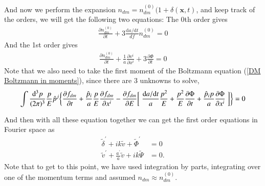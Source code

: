\documentclass[a4paper, 12pt]{article}
\begin{document}
{{    And now we perform the expansion \( n_{dm } = n^{(0)}_{dm }(1 +
    \delta(\textbf{x},t) \), and keep track of the orders, we will get
    the following two equations:
    The 0th order gives 
    \begin{align}
      \label{0th order DM expansion}
      \frac{\partial n_{dm }^{(0)}}{\partial t} + 3
      \frac{\mathrm{d}a / \mathrm{d}t}{df} n_{dm }^{(0)} = 0
    \end{align}
    And the 1st order gives
    \begin{align}
      \label{1st order dm expansion}
      \frac{\partial n_{dm }^{(0)}}{\partial t} + \frac{1}{a}
      \frac{\partial v^{i} }{\partial x^{i} } + 3 \frac{\partial
      \Phi}{\partial t}  = 0   
    \end{align}
    Note that we also need to take the first moment of the Boltzmann
    equation (\ref{DM Boltzmann in moments}), since there are 3 unknowns
    to solve, 
    \begin{align}
      \label{1st moment of DM Boltzmann}
     \int \frac{\mathrm{d}^{3} p}{(2 \pi)^{3}} \frac{p}{E}
      \hat{p}^{j}  \bigg\{ \frac{\partial f_{dm
     }}{\partial t}  + \frac{\hat{p}_{i}}{a} \frac{p}{E} \frac{\partial
     f_{dm }}{\partial x^{i} } - \frac{\partial f_{dm }}{\partial
     E} \bigg[\hspace{0.1cm}\frac{\mathrm{d}a / \mathrm{d}t}{a} \frac{p^2}{E} +
     \frac{p^2}{E} \frac{\partial \Phi}{\partial t} +
     \frac{\hat{p}_{i} p }{a} \frac{\partial \Phi}{\partial x^{i} }
      \hspace{0.1cm}\bigg] \bigg\} = 0
    \end{align}
    
    And then with all these equation together we can get the first
    order equations in Fourier space as 
    \begin{align}
      \label{DM final equation}
      \tilde{\delta}^{\prime} + i k \tilde{v} +
      \tilde{\Phi}^{\prime} &= 0 \\ 
      \tilde{v}^{\prime} + \frac{a^{\prime}}{a} \tilde{v} + i k
      \tilde{\Psi} &= 0.
    \end{align} Note that to get to this point, we have used
    integration by parts, integrating over one of the momentum terms and
    assumed \( n_{dm } \approx n_{dm }^{(0)} \).

}}
\end{document}
